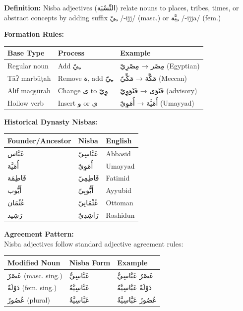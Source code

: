 \documentclass[letterpaper,12pt]{article}
\begin{document}
\begin{tcolorbox}[colback=boxcolor,colframe=headercolor,breakable]
\textbf{Definition:} Nisba adjectives (\textarabic{النِّسْبَة}) relate nouns to places, tribes, times, or abstract concepts by adding suffix \textarabic{ـِيّ} /-ijj/ (masc.) or \textarabic{ـِيَّة} /-ijja/ (fem.)

\textbf{Formation Rules:}

\begin{tabular}{|l|l|l|}
\hline
\textbf{Base Type} & \textbf{Process} & \textbf{Example} \\
\hline
Regular noun & Add \textarabic{ـِيّ} & \textarabic{مِصْر} → \textarabic{مِصْرِيّ} (Egyptian) \\
\hline
Tāʔ marbūṭah & Remove \textarabic{ة}, add \textarabic{ـِيّ} & \textarabic{مَكَّة} → \textarabic{مَكِّيّ} (Meccan) \\
\hline
Alif maqṣūrah & Change \textarabic{ى} to \textarabic{وِيّ} & \textarabic{فَتْوَى} → \textarabic{فَتْوَوِيّ} (advisory) \\
\hline
Hollow verb & Insert \textarabic{و} or \textarabic{ي} & \textarabic{أُمَيَّة} → \textarabic{أُمَوِيّ} (Umayyad) \\
\hline
\end{tabular}

\vspace{0.5em}
\textbf{Historical Dynasty Nisbas:}

\begin{tabular}{|l|l|l|}
\hline
\textbf{Founder/Ancestor} & \textbf{Nisba} & \textbf{English} \\
\hline
\textarabic{عَبَّاس} & \textarabic{عَبَّاسِيّ} & Abbasid \\
\hline
\textarabic{أُمَيَّة} & \textarabic{أُمَوِيّ} & Umayyad \\
\hline
\textarabic{فَاطِمَة} & \textarabic{فَاطِمِيّ} & Fatimid \\
\hline
\textarabic{أَيُّوب} & \textarabic{أَيُّوبِيّ} & Ayyubid \\
\hline
\textarabic{عُثْمَان} & \textarabic{عُثْمَانِيّ} & Ottoman \\
\hline
\textarabic{رَشِيد} & \textarabic{رَاشِدِيّ} & Rashidun \\
\hline
\end{tabular}

\vspace{0.5em}
\textbf{Agreement Pattern:}\\
Nisba adjectives follow standard adjective agreement rules:

\begin{tabular}{|l|l|l|}
\hline
\textbf{Modified Noun} & \textbf{Nisba Form} & \textbf{Example} \\
\hline
\textarabic{عَصْرٌ} (masc. sing.) & \textarabic{عَبَّاسِيٌّ} & \textarabic{عَصْرٌ عَبَّاسِيٌّ} \\
\hline
\textarabic{دَوْلَةٌ} (fem. sing.) & \textarabic{عَبَّاسِيَّةٌ} & \textarabic{دَوْلَةٌ عَبَّاسِيَّةٌ} \\
\hline
\textarabic{عُصُورٌ} (plural) & \textarabic{عَبَّاسِيَّةٌ} & \textarabic{عُصُورٌ عَبَّاسِيَّةٌ} \\
\hline
\end{tabular}
\end{tcolorbox}
\end{document}
